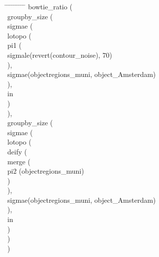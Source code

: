 \documentclass{article}
\begin{document}
\begin{tabbing}
\hspace{0.5cm}     \= \hspace{0.5cm}  \= \hspace{0.5cm}  \= \hspace{0.5cm}  \=\hspace{0.5cm}  \=\hspace{0.5cm} \= \hspace{0.5cm}  \= \hspace{0.5cm} \= \hspace{0.5cm} \= \hspace{0.5cm}\kill
bowtie\_ratio ( \\
\>groupby\_size ( \\
\>\>sigmae (\\
\>\>\>lotopo (\\ 
\>\>\>\>pi1 (\\
\>\>\>\>\>sigmale(revert(contour\_noise), 70)\\
\>\>\>\>),\\
\>\>\>\>sigmae(objectregions\_muni, object\_Amsterdam)\\
\>\>\>),\\
\>\>\>in\\
\>\>)\\
\>),\\ 
\>groupby\_size (\\
\>\>sigmae (\\
\>\>\>lotopo (\\
\>\>\>\>deify (\\
\>\>\>\>\>merge (\\
\>\>\>\>\>\>pi2 (objectregions\_muni)\\
\>\>\>\>\>)\\
\>\>\>\>),\\
\>\>\>\>sigmae(objectregions\_muni, object\_Amsterdam)\\
\>\>\>),\\
\>\>\>in\\
\>\>)\\
\>)\\
)
\end{tabbing}
\end{document}
